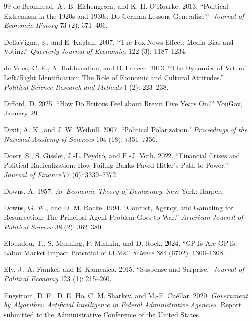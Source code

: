 \documentclass[12pt,letterpaper]{article}
\begin{document}
\begin{thebibliography}{99}
de Bromhead, A., B. Eichengreen, and K. H. O'Rourke. 2013. ``Political Extremism in the 1920s and 1930s: Do German Lessons Generalize?'' \textit{Journal of Economic History} 73 (2): 371--406.

DellaVigna, S., and E. Kaplan. 2007. ``The Fox News Effect: Media Bias and Voting.'' \textit{Quarterly Journal of Economics} 122 (3): 1187--1234.

de Vries, C. E., A. Hakhverdian, and B. Lancee. 2013. ``The Dynamics of Voters' Left/Right Identification: The Role of Economic and Cultural Attitudes.'' \textit{Political Science Research and Methods} 1 (2): 223--238.

Difford, D. 2025. ``How Do Britons Feel about Brexit Five Years On?'' YouGov, January 29.

Dixit, A. K., and J. W. Weibull. 2007. ``Political Polarization.'' \textit{Proceedings of the National Academy of Sciences} 104 (18): 7351--7356.

Doerr, S., S. Gissler, J.-L. Peydr\'{o}, and H.-J. Voth. 2022. ``Financial Crises and Political Radicalization: How Failing Banks Paved Hitler's Path to Power.'' \textit{Journal of Finance} 77 (6): 3339--3372.

Downs, A. 1957. \textit{An Economic Theory of Democracy}. New York: Harper.

Downs, G. W., and D. M. Rocke. 1994. ``Conflict, Agency, and Gambling for Resurrection: The Principal-Agent Problem Goes to War.'' \textit{American Journal of Political Science} 38 (2): 362--380.

Eloundou, T., S. Manning, P. Mishkin, and D. Rock. 2024. ``GPTs Are GPTs: Labor Market Impact Potential of LLMs.'' \textit{Science} 384 (6702): 1306--1308.

Ely, J., A. Frankel, and E. Kamenica. 2015. ``Suspense and Surprise.'' \textit{Journal of Political Economy} 123 (1): 215--260.

Engstrom, D. F., D. E. Ho, C. M. Sharkey, and M.-F. Cu\'{e}llar. 2020. \textit{Government by Algorithm: Artificial Intelligence in Federal Administrative Agencies}. Report submitted to the Administrative Conference of the United States.


\end{thebibliography}
\end{document}
